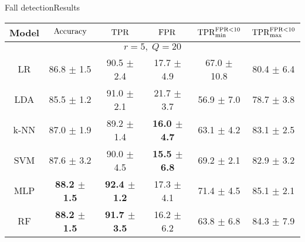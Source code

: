\begin{frame}{Fall detection}{Results}
\begin{table}[ht]
\small
\begin{center}
\begin{tabular}{c c c c c c}
\toprule
  Model     & $\mathrm{Accuracy}$ & $\mathrm{TPR}$ & $\mathrm{FPR}$ & $\mathrm{TPR}_{\text{min}}^{\mathrm{FPR}<10}$ & $\mathrm{TPR}_{\text{max}}^{\mathrm{FPR}<10}$ \\
\midrule
 \multicolumn{6}{c}{\footnotesize $r = 5,\; Q = 20$} \\
\hline
LR   &  86.8 $\pm$ 1.5 & 90.5  $\pm$  2.4 &  17.7  $\pm$  4.9 & 67.0  $\pm$  10.8 & 80.4 $\pm$  6.4 \\
LDA   &  85.5  $\pm$  1.2  & 91.0  $\pm$  2.1 &  21.7  $\pm$  3.7 & 56.9  $\pm$  7.0 & 78.7  $\pm$  3.8 \\
k-NN  &    87.0  $\pm$  1.9 & 89.2  $\pm$  1.4  & \textbf{16.0  $\pm$  4.7} & 63.1  $\pm$  4.2 & 83.1  $\pm$  2.5 \\
SVM  &   87.6  $\pm$  3.2 & 90.0  $\pm$  4.5 & \textbf{15.5  $\pm$  6.8} & 69.2 $\pm$ 2.1 & 82.9  $\pm$  3.2 \\
MLP  &\textbf{88.2  $\pm$  1.5} & \textbf{92.4  $\pm$  1.2} & 17.3  $\pm$  4.1 & 71.4  $\pm$  4.5 & 85.1  $\pm$  2.1\\
RF  & \textbf{88.2  $\pm$  1.5} & \textbf{91.7 $\pm$ 3.5} & 16.2  $\pm$  6.2 & 63.8  $\pm$  6.8 & 84.3  $\pm$  7.9 \\
\bottomrule
\end{tabular}
\end{center}
\end{table}

\end{frame}